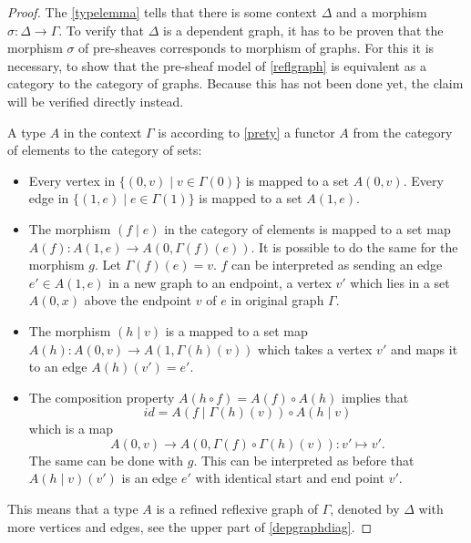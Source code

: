 \documentclass[12pt,a4paper,twoside,xetex]{book} %
\begin{document}
\begin{proof} 

The \cref{typelemma} tells that there is some context $\Delta$ and a morphism $\sigma : \Delta \rightarrow \Gamma$. To verify that $\Delta$ is a dependent graph, it has to be proven that the morphism $\sigma$ of pre-sheaves corresponds to morphism of graphs. For this it is necessary, to show that the pre-sheaf model of \cref{reflgraph} is equivalent as a category to the category of graphs. Because this has not been done yet, the claim will be verified directly instead. 

A type $A$ in the context $\Gamma$ is according to \cref{prety} a functor $A$ from the category of elements to the category of sets:

\begin{itemize}
\item Every vertex in $\{ (0, v) \mid v \in \Gamma (0) \}$ is mapped to a set 
$A(0,v)$. Every edge in $\{ (1, e) \mid e \in \Gamma (1) \}$ is mapped to a set 
$A(1,e)$.

\item The morphism $(f \mid e)$ in the category of elements is mapped to a set 
map $A(f): A(1,e) \rightarrow A(0, \Gamma (f) (e))$.  It is possible to do the 
same for the morphism $g$. Let $\Gamma (f) (e) =v$. $f$ can be interpreted as 
sending an edge $e' \in A(1,e)$ in a new graph to an endpoint, a vertex $v'$ 
which lies in a set $A(0, x)$ above the endpoint $v$ of $e$ in original graph 
$\Gamma$.
 
\item The morphism $(h \mid v)$ is a mapped to a set map $A(h) : A(0,v) 
\rightarrow A(1, \Gamma (h) (v) )$ which takes a vertex $v'$ and maps it to an 
edge $A(h)(v')=e'$.

\item The composition property $A(h \circ f) = A(f) \circ A(h)$ implies that 
$$id = A \left( f \mid \Gamma (h) (v) \right) \circ A \left( h \mid v \right)$$ 
which is a map $$A(0,v) \rightarrow A(0, \Gamma (f) \circ \Gamma (h) (v)): v' 
\mapsto v'.$$ The same can be done with $g$. This can be interpreted as before 
that $A(h \mid v)(v')$ is an edge $e'$ with identical start and end point $v'$.
\end{itemize}

This means that a type $A$ is a refined reflexive graph of $\Gamma$, denoted by $\Delta$ with more 
vertices and edges, see the upper part of \cref{depgraphdiag}.



\end{proof}
\end{document}
